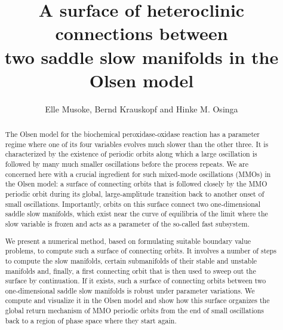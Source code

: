 \documentclass{ws-ijbc}
\begin{document}
\catchline{}{}{}{}{} %


\title{A surface of heteroclinic connections between \\ two saddle slow manifolds in the Olsen model}

\author{Elle Musoke, Bernd Krauskopf and Hinke M. Osinga}


\address{Department of Mathematics, University of Auckland \\
  Private Bag 92019, Auckland 1142, New Zealand \\
elle.musoke@auckland.ac.nz; b.krauskopf@auckland.ac.nz; h.m.osinga@auckland.ac.nz}

\maketitle

\begin{history}
\end{history}

\begin{abstract}
  The Olsen model for the biochemical peroxidase-oxidase reaction has a parameter regime where one of its four variables evolves much slower than the other three. It is characterized by the existence of periodic orbits along which a large oscillation is followed by many much smaller oscillations before the process repeats. We are concerned here with a crucial ingredient for such mixed-mode oscillations (MMOs) in the Olsen model: a surface of connecting orbits that is followed closely by the MMO periodic orbit during its global, large-amplitude transition back to another onset of small oscillations. Importantly, orbits on this surface connect two one-dimensional saddle slow manifolds, which exist near the curve of equilibria of the limit where the slow variable is frozen and acts as a parameter of the so-called fast subsystem. 

\hspace*{7mm}We present a numerical method, based on formulating suitable boundary value problems, to compute such a surface of connecting orbits. It involves a number of steps to compute the slow manifolds, certain submanifolds of their stable and unstable manifolds and, finally, a first connecting orbit that is then used to sweep out the surface by continuation. If it exists, such a surface of connecting orbits between two one-dimensional saddle slow manifolds is robust under parameter variations. We compute and visualize it in the Olsen model and show how this surface organizes the global return mechanism of MMO periodic orbits from the end of small oscillations back to a region of phase space where they start again. 
\end{abstract}
\end{document}
